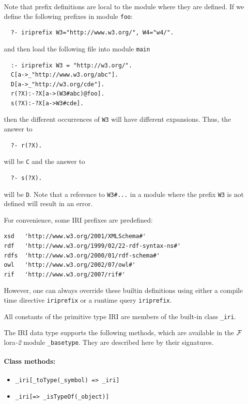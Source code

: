 \documentclass[11pt]{article}
\newcommand{\FLORA}{{\mbox{\sc ${\cal F}${lora}\rm\emph{-2}}}\xspace}
\begin{document}
Note that prefix definitions are local to the module where they are
defined. If we define the following prefixes in module {\tt foo}:
\begin{verbatim}
  ?- iriprefix W3="http://www.w3.org/", W4="w4/".
\end{verbatim}
and then load the following file into module {\tt main} 
\begin{verbatim}
  :- iriprefix W3 = "http://w3.org/".
  C[a->_"http://www.w3.org/abc"].
  D[a->_"http://w3.org/cde"].
  r(?X):-?X[a->(W3#abc)@foo].
  s(?X):-?X[a->W3#cde].
\end{verbatim}
then  the different occurrences of {\tt W3} will have different expansions.
Thus, the answer to
\begin{verbatim}
  ?- r(?X).
\end{verbatim}
will be {\tt C} and the answer to
\begin{verbatim}
  ?- s(?X).
\end{verbatim}
will be {\tt D}.  Note that a reference to {\tt W3\#...} in a module
where the prefix {\tt W3} is not defined will result in an error.

For convenience, some IRI prefixes are predefined:
\begin{verbatim}
xsd   'http://www.w3.org/2001/XMLSchema#'
rdf   'http://www.w3.org/1999/02/22-rdf-syntax-ns#'
rdfs  'http://www.w3.org/2000/01/rdf-schema#'
owl   'http://www.w3.org/2002/07/owl#'
rif   'http://www.w3.org/2007/rif#'
\end{verbatim}
However, one can always override these builtin definitions using either a
compile time directive {\tt iriprefix} or a runtime query {\tt iriprefix}.

All constants of the primitive type IRI are members of the built-in class
{\tt \_iri}. 

The IRI data type supports the following methods, which are available in
the \FLORA module {\tt \_basetype}. They are described here by their
signatures.
\paragraph{Class methods:}
\begin{itemize}
\item  {\tt \_iri[\_toType(\_symbol) => \_iri]}
\item {\tt \_iri[=> \_isTypeOf(\_object)]}
\end{itemize}
\end{document}
